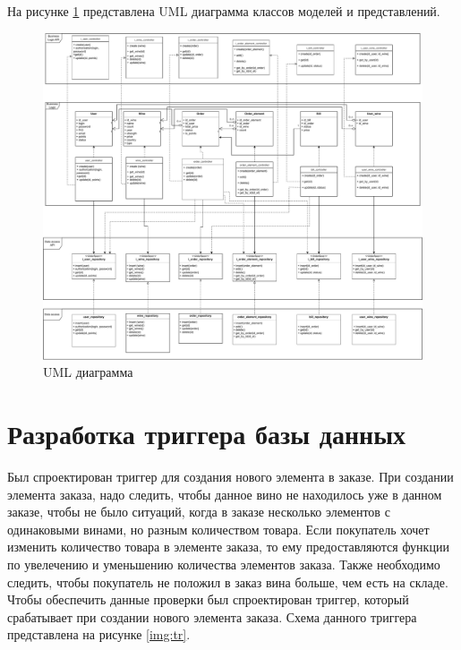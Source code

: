 На рисунке \ref{img:uml} представлена UML диаграмма классов моделей
и представлений.
\begin{figure}[H]
	\centering
	\includegraphics[scale=0.40]{inc/img/uml.pdf}
	\caption{UML диаграмма}
	\label{img:uml}
\end{figure} 

\section{Разработка триггера базы данных}

Был спроектирован триггер для создания нового элемента в заказе. При создании элемента заказа, надо следить, чтобы данное вино не находилось уже в данном заказе, чтобы не было ситуаций, когда в заказе несколько элементов с одинаковыми винами, но разным количеством товара. Если покупатель хочет изменить количество товара в элементе заказа, то ему предоставляются функции по увелечению и уменьшению количества элементов заказа. Также необходимо следить, чтобы покупатель не положил в заказ вина больше, чем есть на складе. Чтобы обеспечить данные проверки был спроектирован триггер, который срабатывает при создании нового элемента заказа. Схема данного триггера представлена на рисунке \ref{img:tr}.

